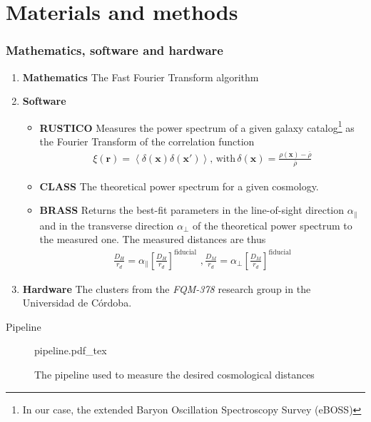 \documentclass{beamer}
\newcommand{\incfig}[2][1]{%
    \def\svgwidth{#1\columnwidth}
    {#2.pdf_tex}
}
\begin{document}
\section{Materials and methods}
\begin{frame}[allowframebreaks]
\frametitle{Mathematics, software and hardware}

\begin{enumerate}
	\item \textbf{Mathematics} The Fast Fourier Transform algorithm
	\item \textbf{Software}
		\begin{itemize}
			\item \textbf{RUSTICO} Measures the power spectrum of a given galaxy catalog\footnote{In our case, the extended Baryon Oscillation Spectroscopy Survey (eBOSS)} as the Fourier Transform of the correlation function
			\begin{align}
				\xi(\textbf{r}) = \left<\delta(\textbf{x})\delta (\textbf{x}') \right>,\, \text{with}\, \delta(\textbf{x}) = \frac{\rho(\textbf{x}) - \overline{\rho}}{\overline{\rho}}
			\end{align}
		\item \textbf{CLASS} The theoretical power spectrum for a given cosmology.
		\item \textbf{BRASS} Returns the best-fit parameters in the line-of-sight direction $\alpha_\parallel$ and in the transverse direction $\alpha_\perp$ of the theoretical power spectrum to the measured one. The measured distances are thus
	\vspace{-0.2cm}
		\begin{align}
			\frac{D_H}{r_d} = \alpha_\parallel \left[ \frac{D_H}{r_d} \right] ^\text{fiducial}\,\,,
			\frac{D_M}{r_d} = \alpha_\perp \left[ \frac{D_M}{r_d} \right] ^\text{fiducial}
		\end{align}
		\end{itemize}
	\vspace{-0.3cm}
	\item \textbf{Hardware} The clusters from the \textit{FQM-378} research group in the Universidad de Córdoba.

\end{enumerate}


\end{frame}

\begin{frame}{Pipeline}

	\begin{figure}[h]
		\centering
		\incfig{pipeline}
		\caption{The pipeline used to measure the desired cosmological distances}
		\label{fig:-figs-pipeline-pdf}
	\end{figure}
\end{frame}
\end{document}
